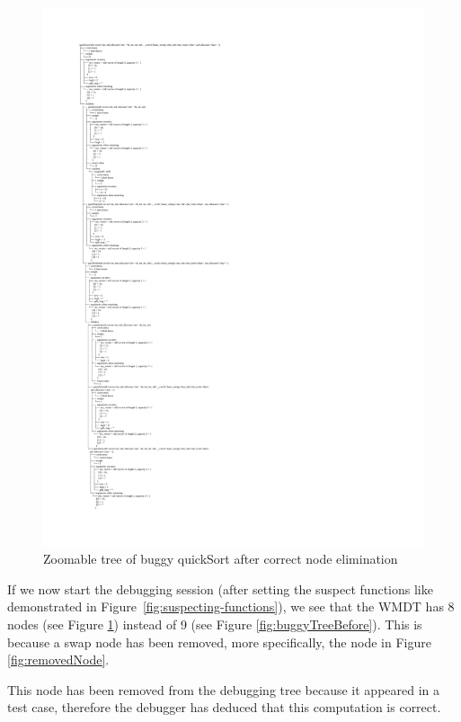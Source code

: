 \begin{figure}
\centering
    \caption{Zoomable tree of buggy quickSort after correct node elimination}
    \label{fig:treeAfterRemoval}
\includegraphics[width=\textwidth,height=\textheight,keepaspectratio]{Imagenes/Vectorial/buggySwapRemoved.pdf}
\end{figure}
If we now start the debugging session (after setting the suspect functions like demonstrated in Figure~\ref{fig:suspecting-functions}), we see that the WMDT has 8 nodes (see Figure \ref{fig:treeAfterRemoval}) instead of 9 (see Figure \ref{fig:buggyTreeBefore}). This is because a swap node has been removed, more specifically, the node in Figure \ref{fig:removedNode}.

This node has been removed from the debugging tree because it appeared in a test case, therefore the debugger has deduced that this computation is correct.

